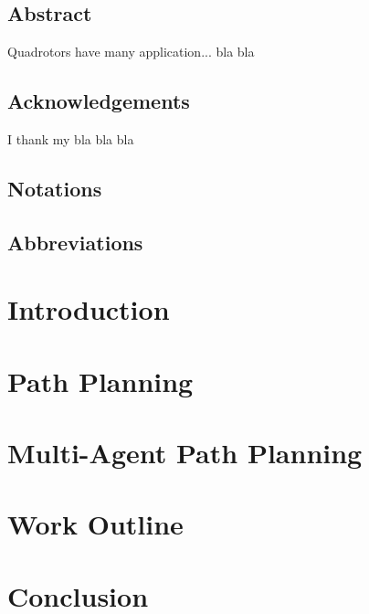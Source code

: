 \documentclass{thesisreport}
\begin{document}
  
 
\section*{Abstract}
Quadrotors have many application... bla bla
\newpage
\section*{Acknowledgements}
I thank my bla bla bla 

\newpage

\section*{Notations}


\section*{Abbreviations}
 
 
\listoffigures


\tableofcontents


\chapter*{Introduction}
 

\chapter{Path Planning}
 
\chapter{Multi-Agent Path Planning} 
 
\chapter{Work Outline}
 
\chapter*{Conclusion}
 
  
\newpage


 

 
 
 
 
\end{document}
